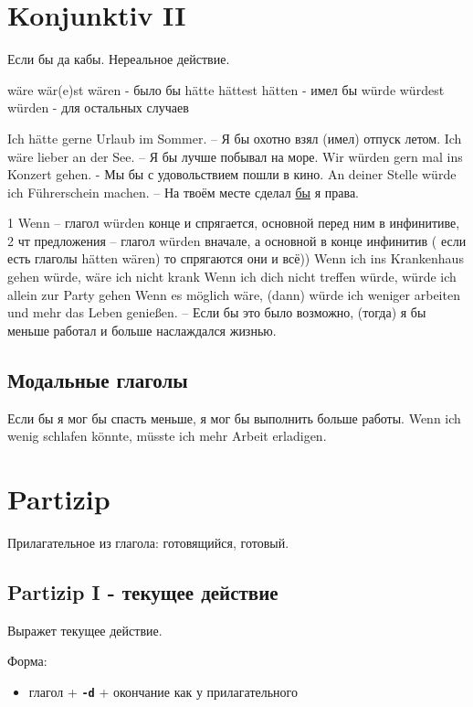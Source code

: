 \documentclass[12pt,a4paper]{report}
\newcommand{\term}[1]{\texttt{\textbf{#1}}}
\newcommand{\satzew}[1]{\underline{#1}}
\begin{document}
\chapter{Konjunktiv II}
Если бы да кабы. Нереальное действие.

wäre wär(e)st wären - было бы
hätte hättest hätten - имел бы
würde würdest würden - для остальных случаев

Ich hätte gerne Urlaub im Sommer. – Я бы охотно взял (имел) отпуск летом.
Ich wäre lieber an der See. – Я бы лучше побывал на море.
Wir würden gern mal ins Konzert gehen. - Мы бы с удовольствием пошли в кино.
An deiner Stelle würde ich Führerschein machen. – На твоём месте сделал \satzew{бы} я права.

1 Wenn – глагол würden  конце и спрягается, основной перед ним в инфинитиве,  2 чт предложения – глагол würden вначале, а основной в конце инфинитив ( если есть глаголы hätten wären) то спрягаются они и всё))
Wenn ich ins Krankenhaus gehen würde,  wäre ich nicht krank
Wenn ich dich nicht treffen würde, würde ich allein zur Party gehen
Wenn es möglich wäre, (dann) würde ich weniger arbeiten und mehr das Leben genießen. – Если бы это было возможно, (тогда) я бы меньше работал и больше наслаждался жизнью.

\section{Модальные глаголы}

Если бы я мог бы спасть меньше, я мог бы выполнить больше работы.
Wenn ich wenig schlafen könnte, müsste ich mehr Arbeit erladigen.

\chapter{Partizip}
Прилагательное из глагола: готовящийся, готовый.

\section{Partizip I - текущее действие}

Выражет текущее действие.

Форма:
\begin{itemize}
\item глагол + \term{-d} + окончание как у прилагательного
\end{itemize}
\end{document}
